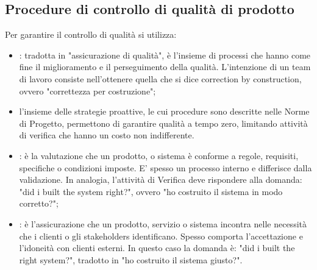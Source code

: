 \subsection{Procedure di controllo di qualità di prodotto} %
\label{2.3}
Per garantire il controllo di qualità si utilizza:
\begin{itemize}
\item {}: tradotta in "assicurazione di qualità", è l'insieme di processi che hanno come fine il miglioramento e il perseguimento della qualità. L'intenzione di un team di lavoro consiste nell'ottenere quella che si dice correction by construction, ovvero "correttezza per costruzione";
\item {}l'insieme delle strategie proattive, le cui procedure sono descritte nelle Norme di Progetto, permettono di garantire qualità a tempo zero, limitando attività di verifica che hanno un costo non indifferente.
\item {}: è la valutazione che un prodotto,  o sistema è conforme a regole, requisiti, specifiche o condizioni imposte. E' spesso un processo interno e differisce dalla validazione. In analogia, l'attività di Verifica deve rispondere alla domanda: "did i built the system right?", ovvero "ho costruito il sistema in modo corretto?";
\item {}: è l'assicurazione che un prodotto, servizio o sistema incontra nelle necessità che i clienti o gli stakeholders identificano. Spesso comporta l'accettazione e l'idoneità con clienti esterni. In questo caso la domanda è: "did i built the right system?", tradotto in "ho costruito il sistema giusto?".
\end{itemize}

